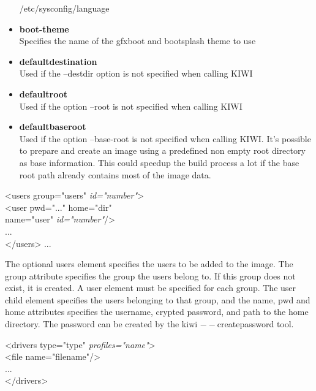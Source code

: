 \begin{itemize}
      /etc/sysconfig/language
\item \textbf{boot-theme}\\
      Specifies the name of the gfxboot and bootsplash theme to use
\item \textbf{defaultdestination}\\
      Used if the --destdir option is not specified when calling KIWI
\item \textbf{defaultroot}\\
      Used if the option --root is not specified when calling KIWI
\item \textbf{defaultbaseroot}\\
      Used if the option --base-root is not specified when
      calling KIWI. It's possible to prepare and create an image using a
      predefined non empty root directory as base information.
      This could speedup the build process a lot if the base root path
      already contains most of the image data.
\end{itemize}

\begin{Command}{12cm}
<users group="users" \textit{id="number"}>\\
\hspace*{1cm}<user pwd="..." home="dir"\\ 
\hspace*{1.5cm}name="user" \textit{id="number"}/>\\
\hspace*{1cm}...\\
</users>
...
\end{Command}

The optional users element specifies the users to be added to the image.
The group attribute specifies the group the users belong to. If this group
does not exist, it is created. A user element must be specified for
each group. The user child element specifies the users belonging to that
group, and the name, pwd and home attributes specifies the username,
crypted password, and path to the home directory. The password can be
created by the kiwi $--$createpassword tool.

\begin{Command}{12cm}
<drivers type="type" \textit{profiles="name"}>\\
\hspace*{1cm}<file name="filename"/>\\
\hspace*{1cm}...\\
</drivers>
\end{Command}

